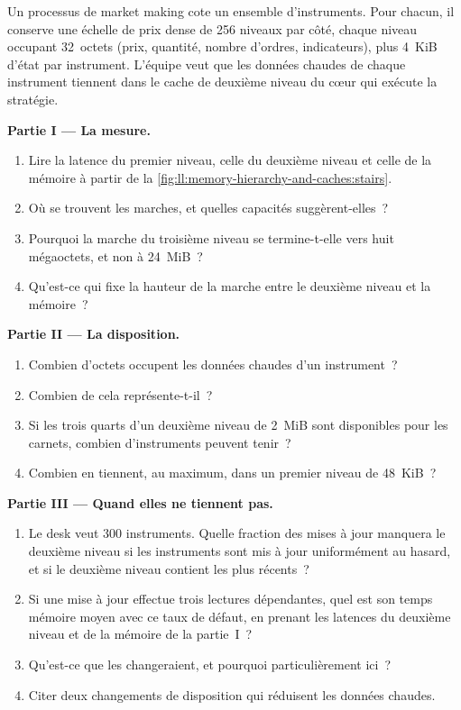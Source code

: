 \begin{problem}\label{pb:ll:memory-hierarchy-and-caches:1}
Un processus de market making cote un ensemble d'instruments. Pour chacun, il conserve une échelle de prix dense de 256 niveaux par côté,
chaque niveau occupant 32~octets (prix, quantité, nombre d'ordres, indicateurs), plus 4~KiB d'état par instrument. L'équipe veut que
les données chaudes de chaque instrument tiennent dans le cache de deuxième niveau du cœur qui exécute la stratégie.

\medskip\noindent\textbf{Partie I --- La mesure.}
\begin{enumerate}
\item Lire la latence du premier niveau, celle du deuxième niveau et celle de la mémoire à partir de
la \cref{fig:ll:memory-hierarchy-and-caches:stairs}.
\item Où se trouvent les marches, et quelles capacités suggèrent-elles~?
\item Pourquoi la marche du troisième niveau se termine-t-elle vers huit mégaoctets, et non à 24~MiB~?
\item Qu'est-ce qui fixe la hauteur de la marche entre le deuxième niveau et la mémoire~?
\end{enumerate}

\medskip\noindent\textbf{Partie II --- La disposition.}
\begin{enumerate}[resume]
\item Combien d'octets occupent les données chaudes d'un instrument~?
\item Combien de  cela représente-t-il~?
\item Si les trois quarts d'un deuxième niveau de 2~MiB sont disponibles pour les carnets, combien d'instruments peuvent tenir~?
\item Combien en tiennent, au maximum, dans un premier niveau de 48~KiB~?
\end{enumerate}

\medskip\noindent\textbf{Partie III --- Quand elles ne tiennent pas.}
\begin{enumerate}[resume]
\item Le desk veut 300 instruments. Quelle fraction des mises à jour manquera le deuxième niveau si les instruments sont mis à jour
uniformément au hasard, et si le deuxième niveau contient les plus récents~?
\item Si une mise à jour effectue trois lectures dépendantes, quel est son temps mémoire moyen avec ce taux de défaut, en prenant les
latences du deuxième niveau et de la mémoire de la partie~I~?
\item Qu'est-ce que les  changeraient, et pourquoi particulièrement ici~?
\item Citer deux changements de disposition qui réduisent les données chaudes.
\end{enumerate}


\end{problem}
